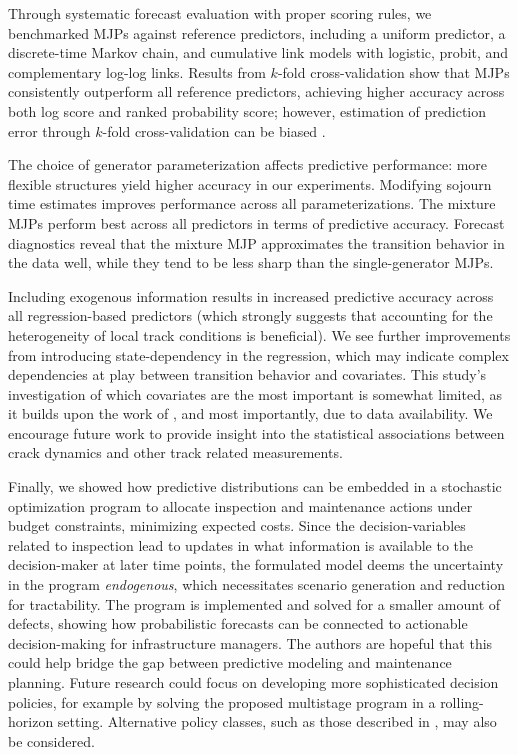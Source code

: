 Through systematic forecast evaluation with proper scoring rules, we benchmarked MJPs against reference predictors, including a uniform predictor, a discrete-time Markov chain, and cumulative link models with logistic, probit, and complementary log-log links. Results from $k$-fold cross-validation show that MJPs consistently outperform all reference predictors, achieving higher accuracy across both log score and ranked probability score; however, estimation of prediction error through $k$-fold cross-validation can be biased \citep{fushiki2011a}.

The choice of generator parameterization affects predictive performance: more flexible structures yield higher accuracy in our experiments. Modifying sojourn time estimates improves performance across all parameterizations. 
The mixture MJPs perform best across all predictors in terms of predictive accuracy. Forecast diagnostics reveal that the mixture MJP approximates the transition behavior in the data well, while they tend to be less sharp than the single-generator MJPs.

Including exogenous information results in increased predictive accuracy across all regression-based predictors (which strongly suggests that accounting for the heterogeneity of local track conditions is beneficial). We see further improvements from introducing state-dependency in the regression, which may indicate complex dependencies at play between transition behavior and covariates. This study's investigation of which covariates are the most important is somewhat limited, as it builds upon the work of \citet{bisgaard2024A}, and most importantly, due to data availability. We encourage future work to provide insight into the statistical associations between crack dynamics and other track related measurements.

Finally, we showed how predictive distributions can be embedded in a stochastic optimization program to allocate inspection and maintenance actions under budget constraints, minimizing expected costs. 
Since the decision-variables related to inspection lead to updates in what information is available to the decision-maker at later time points, the formulated model deems the uncertainty in the program \textit{endogenous}, which necessitates scenario generation and reduction for tractability.
The program is implemented and solved for a smaller amount of defects, showing how probabilistic forecasts can be connected to actionable decision-making for infrastructure managers. The authors are hopeful that this could help bridge the gap between predictive modeling and maintenance planning.  Future research could focus on developing more sophisticated decision policies, for example by solving the proposed multistage program in a rolling-horizon setting. Alternative policy classes, such as those described in \citet{powell2018a}, may also be considered.



